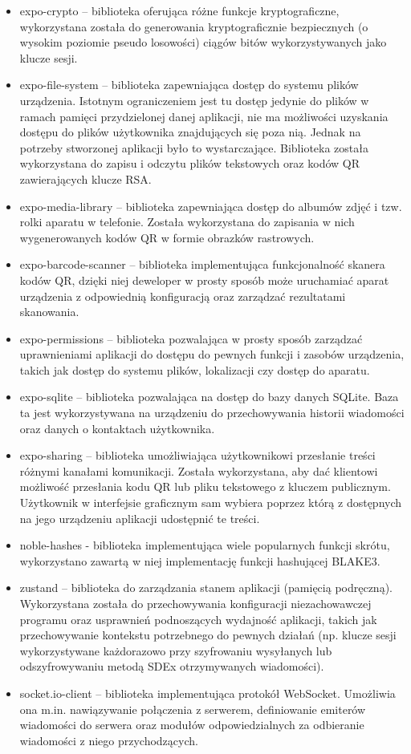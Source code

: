 \documentclass[../main.tex]{subfiles}
\begin{document}
\begin{itemize}
    \item expo-crypto -- biblioteka oferująca różne funkcje kryptograficzne, wykorzystana została do generowania kryptograficznie bezpiecznych (o wysokim poziomie pseudo losowości) ciągów bitów wykorzystywanych jako klucze sesji.
	\item expo-file-system -- biblioteka zapewniająca dostęp do systemu plików urządzenia. Istotnym ograniczeniem jest tu dostęp jedynie do plików w ramach pamięci przydzielonej danej aplikacji, nie ma możliwości uzyskania dostępu do plików użytkownika znajdujących się poza nią. Jednak na potrzeby stworzonej aplikacji było to wystarczające. Biblioteka została wykorzystana do zapisu i odczytu plików tekstowych oraz kodów QR zawierających klucze RSA.
	\item expo-media-library -- biblioteka zapewniająca dostęp do albumów zdjęć i tzw. rolki aparatu w telefonie. Została wykorzystana do zapisania w nich wygenerowanych kodów QR w formie obrazków rastrowych.
	\item expo-barcode-scanner -- biblioteka implementująca funkcjonalność skanera kodów QR, dzięki niej deweloper w prosty sposób może uruchamiać aparat urządzenia z odpowiednią konfiguracją oraz zarządzać rezultatami skanowania.
	\item expo-permissions -- biblioteka pozwalająca w prosty sposób zarządzać uprawnieniami aplikacji do dostępu do pewnych funkcji i zasobów urządzenia, takich jak dostęp do systemu plików, lokalizacji czy dostęp do aparatu.
	\item expo-sqlite -- biblioteka pozwalająca na dostęp do bazy danych SQLite. Baza ta jest wykorzystywana na urządzeniu do przechowywania historii wiadomości oraz danych o kontaktach użytkownika.
	\item expo-sharing -- biblioteka umożliwiająca użytkownikowi przesłanie treści różnymi kanałami komunikacji. Została wykorzystana, aby dać klientowi możliwość przesłania kodu QR lub pliku tekstowego z kluczem publicznym. Użytkownik w interfejsie graficznym sam wybiera poprzez którą z dostępnych na jego urządzeniu aplikacji udostępnić te treści.
    \item noble-hashes - biblioteka implementująca wiele popularnych funkcji skrótu, wykorzystano zawartą w niej implementację funkcji hashującej BLAKE3.
	\item zustand -- biblioteka do zarządzania stanem aplikacji (pamięcią podręczną). Wykorzystana została do przechowywania konfiguracji niezachowawczej programu oraz usprawnień podnoszących wydajność aplikacji, takich jak przechowywanie kontekstu potrzebnego do pewnych działań (np. klucze sesji wykorzystywane każdorazowo przy szyfrowaniu wysyłanych lub odszyfrowywaniu metodą SDEx otrzymywanych wiadomości).
	\item socket.io-client -- biblioteka implementująca protokół WebSocket. Umożliwia ona m.in. nawiązywanie połączenia z serwerem, definiowanie emiterów wiadomości do serwera oraz modułów odpowiedzialnych za odbieranie wiadomości z niego przychodzących.
\end{itemize}
\end{document}
